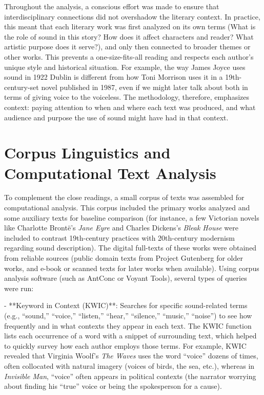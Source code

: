 \documentclass[12pt]{report}
\begin{document}
Throughout the analysis, a conscious effort was made to ensure that interdisciplinary connections did not overshadow the literary context. In practice, this meant that each literary work was first analyzed on its own terms (What is the role of sound in this story? How does it affect characters and reader? What artistic purpose does it serve?), and only then connected to broader themes or other works. This prevents a one-size-fits-all reading and respects each author’s unique style and historical situation. For example, the way James Joyce uses sound in 1922 Dublin is different from how Toni Morrison uses it in a 19th-century-set novel published in 1987, even if we might later talk about both in terms of giving voice to the voiceless. The methodology, therefore, emphasizes context: paying attention to when and where each text was produced, and what audience and purpose the use of sound might have had in that context.

\section{Corpus Linguistics and Computational Text Analysis}
To complement the close readings, a small corpus of texts was assembled for computational analysis. This corpus included the primary works analyzed and some auxiliary texts for baseline comparison (for instance, a few Victorian novels like Charlotte Brontë’s \textit{Jane Eyre} and Charles Dickens’s \textit{Bleak House} were included to contrast 19th-century practices with 20th-century modernism regarding sound description). The digital full-texts of these works were obtained from reliable sources (public domain texts from Project Gutenberg for older works, and e-book or scanned texts for later works when available). Using corpus analysis software (such as AntConc or Voyant Tools), several types of queries were run:

- **Keyword in Context (KWIC)**: Searches for specific sound-related terms (e.g., “sound,” “voice,” “listen,” “hear,” “silence,” “music,” “noise”) to see how frequently and in what contexts they appear in each text. The KWIC function lists each occurrence of a word with a snippet of surrounding text, which helped to quickly survey how each author employs those terms. For example, KWIC revealed that Virginia Woolf’s \textit{The Waves} uses the word “voice” dozens of times, often collocated with natural imagery (voices of birds, the sea, etc.), whereas in \textit{Invisible Man}, “voice” often appears in political contexts (the narrator worrying about finding his “true” voice or being the spokesperson for a cause).
\end{document}
